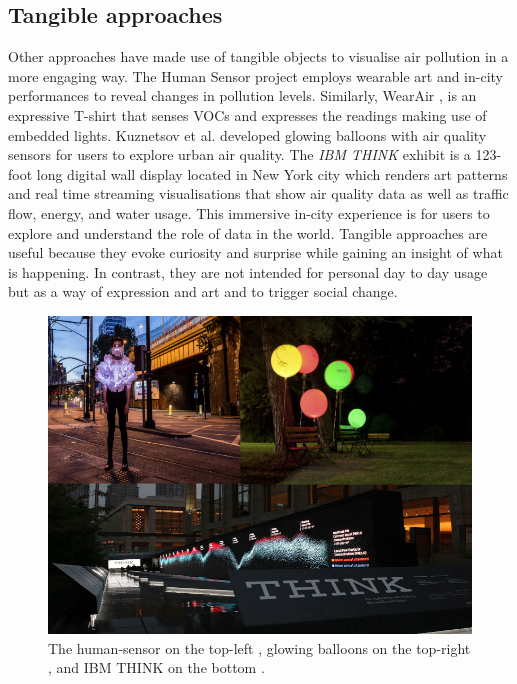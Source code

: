 \subsection{Tangible approaches}
Other approaches have made use of tangible objects to visualise air pollution in a more engaging way. The Human Sensor project \cite{InvisibleDust2016} employs wearable art and in-city performances to reveal changes in pollution levels. Similarly, WearAir \cite{Kim2010},  is an expressive T-shirt that senses VOCs and expresses the readings making use of embedded lights. Kuznetsov et al. \cite{Kuznetsov2011} developed glowing balloons with air quality sensors for users to explore urban air quality. The \textit{IBM THINK} exhibit \cite{IBM2012} is a 123-foot long digital wall display located in New York city which renders art patterns and real time streaming visualisations  that show air quality data as well as traffic flow, energy, and water usage. This immersive in-city experience is for users to explore and understand the role of data in the world. Tangible approaches are useful because they evoke curiosity and surprise while gaining an insight of what is happening. In contrast, they are not intended for personal day to day usage but as a way of expression and art and to trigger social change. 

\begin{figure}[H]
\begin{adjustbox}{width=.8\textwidth,center=\textwidth}
  \centering
  \includegraphics[scale=.4]{images/think_human_sensor_balloons.jpg}
\end{adjustbox}
  \caption[Tangible visualisations]{The human-sensor on the top-left \cite{InvisibleDust2016}, glowing balloons on the top-right \cite{Kuznetsov2011}, and IBM THINK on the bottom \cite{IBM2012}.}
  \label{fig:photo_based_instaNO2}
\end{figure}

